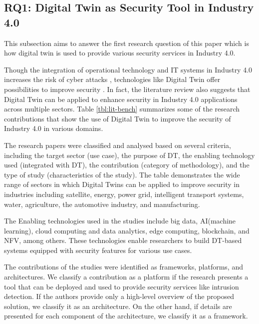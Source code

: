%
%
\subsection{RQ1: { Digital Twin as Security Tool in Industry 4.0}}
\label{sec:rq1dtsec}
This subsection aims to answer the first research question of this paper which is how digital twin is used to provide various security services in Industry 4.0. 

Though the integration of operational technology and IT systems in Industry 4.0 increases the risk of cyber attacks \cite{rajivfaleiroDigitalTwinCybersecurity2022}, technologies like Digital Twin offer possibilities to improve security \cite{dietzHarnessingDigitalTwin2022}. In fact, the literature review also suggests that Digital Twin can be applied to enhance security in Industry 4.0 applications across multiple sectors. Table \ref{tbl:lit-bench} summarizes some of the research contributions that show the use of Digital Twin to improve the security of Industry 4.0 in various domains. 

The research papers were classified and analysed based on several criteria, including the target sector (use case), the purpose of DT, the enabling technology used (integrated with DT), the contribution (category of methodology), and the type of study (characteristics of the study). The table demonstrates the wide range of sectors in which Digital Twins can be applied to improve security in industries including satellite, energy, power grid, intelligent transport systems, water, agriculture, the automotive industry, and manufacturing.

The Enabling technologies used in the studies include big data,  AI(machine learning), cloud computing and data analytics, edge computing, blockchain, and NFV, among others. These technologies enable researchers to build DT-based systems equipped with security features for various use cases.

The contributions of the studies were identified as frameworks, platforms, and architectures. We classify a contribution as a platform if the research presents a tool that can be deployed and used to provide security services like intrusion detection. If the authors provide only a high-level overview of the proposed solution, we classify it as an architecture. On the other hand, if details are presented for each component of the architecture, we classify it as a framework.

